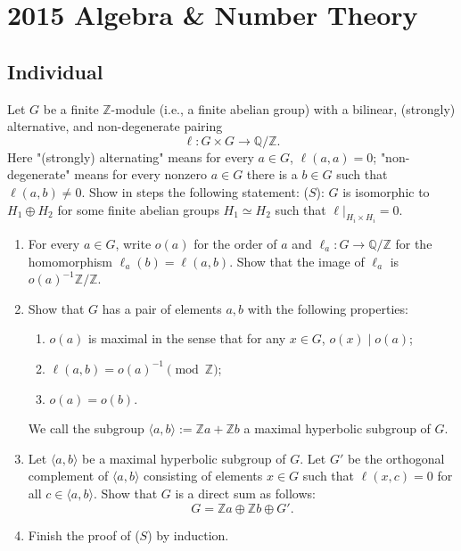 \section{2015 Algebra \& Number Theory}

\subsection*{Individual}
\begin{exercise}
\label{algebra:2015:1}
Let $G$ be a finite $\mathbb{Z}$-module (i.e., a finite abelian group) with a bilinear, (strongly) alternative, and non-degenerate pairing
\[
\ell : G \times G \to \mathbb{Q} / \mathbb{Z}.
\]
Here "(strongly) alternating" means for every $a \in G$, $\ell(a, a) = 0$; "non-degenerate" means for every nonzero $a \in G$ there is a $b \in G$ such that $\ell(a, b) \neq 0$. Show in steps the following statement:
($S$): $G$ is isomorphic to $H_1 \oplus H_2$ for some finite abelian groups $H_1 \simeq H_2$ such that $\ell|_{H_i \times H_i} = 0$.
\begin{enumerate}
    \item For every $a \in G$, write $o(a)$ for the order of $a$ and $\ell_a : G \to \mathbb{Q} / \mathbb{Z}$ for the homomorphism $\ell_a(b) = \ell(a, b)$. Show that the image of $\ell_a$ is $o(a)^{-1}\mathbb{Z} / \mathbb{Z}$.
    \item Show that $G$ has a pair of elements $a, b$ with the following properties:
    \begin{enumerate}
        \item $o(a)$ is maximal in the sense that for any $x \in G$, $o(x) \mid o(a)$;
        \item $\ell(a, b) = o(a)^{-1} \pmod{\mathbb{Z}}$;
        \item $o(a) = o(b)$.
    \end{enumerate}
    We call the subgroup $\langle a, b \rangle := \mathbb{Z}a + \mathbb{Z}b$ a maximal hyperbolic subgroup of $G$.
    \item Let $\langle a, b \rangle$ be a maximal hyperbolic subgroup of $G$. Let $G'$ be the orthogonal complement of $\langle a, b \rangle$ consisting of elements $x \in G$ such that $\ell(x, c) = 0$ for all $c \in \langle a, b \rangle$. Show that $G$ is a direct sum as follows:
    \[
    G = \mathbb{Z}a \oplus \mathbb{Z}b \oplus G'.
    \]
    \item Finish the proof of ($S$) by induction.
\end{enumerate}
\end{exercise}

